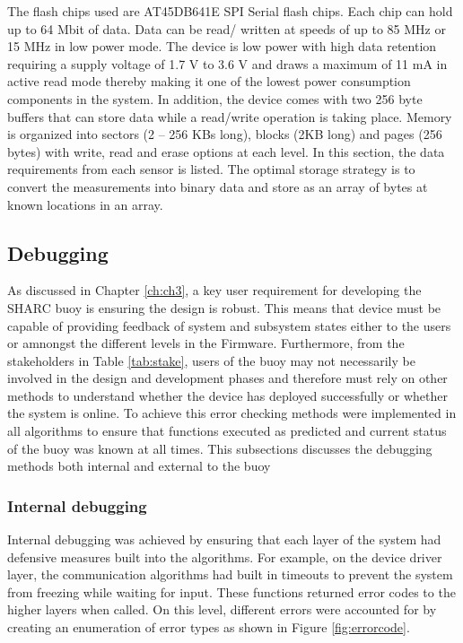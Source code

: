 The flash chips used are AT45DB641E SPI Serial flash chips. Each chip can hold up to 64 Mbit of data. Data can be read/ written at speeds of up to 85 MHz or 15 MHz in low power mode. The device is low power with high data retention requiring a supply voltage of 1.7 V to 3.6 V and draws a maximum of 11 mA in active read mode thereby making it one of the lowest power consumption components in the system. In addition, the device comes with two 256 byte buffers that can store data while a read/write operation is taking place. Memory is organized into sectors (2 – 256 KBs long), blocks (2KB long) and pages (256 bytes) with write, read and erase options at each level. In this section, the data requirements from each sensor is listed. The optimal storage strategy is to convert the measurements into binary data and store as an array of bytes at known locations in an array. \par 

\subsection{Debugging}

As discussed in Chapter \ref{ch:ch3}, a key user requirement for developing the SHARC buoy is ensuring the design is robust. This means that device must be capable of providing feedback of system and subsystem states either to the users or amnongst the different levels in the Firmware. Furthermore, from the stakeholders in Table \ref{tab:stake}, users of the buoy may not necessarily be involved in the design and development phases and therefore must rely on other methods to understand whether the device has deployed successfully or whether the system is online. To achieve this error checking methods were implemented in all algorithms to ensure that functions executed as predicted and current status of the buoy was known at all times. This subsections discusses the debugging methods both internal and external to the buoy

\subsubsection{Internal debugging}

Internal debugging was achieved by ensuring that each layer of the system had defensive measures built into the algorithms. For example, on the device driver layer, the communication algorithms had built in timeouts to prevent the system from freezing while waiting for input. These functions returned error codes to the higher layers when called. On this level, different errors were accounted for by creating an enumeration of error types as shown in Figure \ref{fig:errorcode}.

